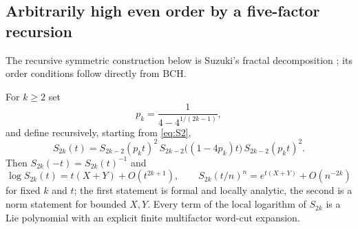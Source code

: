 \subsection{Arbitrarily high even order by a five-factor recursion}
The recursive symmetric construction below is Suzuki's fractal
decomposition \cite{suzuki1990,suzuki1991}; its order conditions follow
directly from BCH.
\begin{theorem}\label{thm:suzuki}
For $k\geq2$ set
\begin{equation}\label{eq:suzukip}
 p_k=\frac1{4-4^{1/(2k-1)}},
\end{equation}
and define recursively, starting from \eqref{eq:S2},
\begin{equation}\label{eq:suzuki}
 S_{2k}(t)=S_{2k-2}(p_kt)^2\,S_{2k-2}\bigl((1-4p_k)t\bigr)\,S_{2k-2}(p_kt)^2.
\end{equation}
Then $S_{2k}(-t)=S_{2k}(t)^{-1}$ and
\begin{equation}\label{eq:suzukiorder}
 \log S_{2k}(t)=t(X+Y)+O(t^{2k+1}),\qquad
 S_{2k}(t/n)^n=e^{t(X+Y)}+O(n^{-2k})
\end{equation}
for fixed $k$ and $t$; the first statement is formal and locally analytic,
the second is a norm statement for bounded $X,Y$. Every term of the local
logarithm of $S_{2k}$ is a Lie polynomial with an explicit finite
multifactor word-cut expansion.
\end{theorem}
